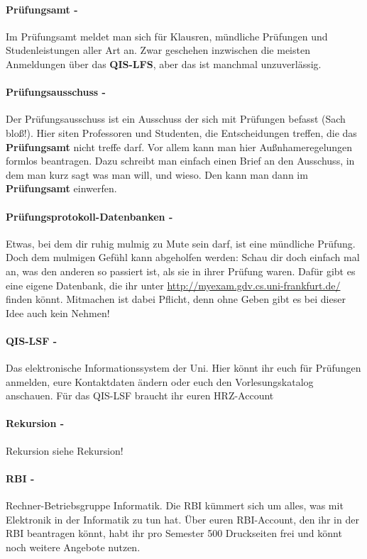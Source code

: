 \paragraph{Prüfungsamt -} Im Prüfungsamt meldet man sich für Klausren, mündliche Prüfungen und Studenleistungen aller Art an. Zwar geschehen inzwischen die meisten Anmeldungen über das \textbf{QIS-LFS}, aber das ist manchmal unzuverlässig.
\paragraph{Prüfungsausschuss -} Der Prüfungsausschuss ist ein Ausschuss der sich mit Prüfungen befasst (Sach bloß!). Hier siten Professoren und Studenten, die Entscheidungen treffen, die das \textbf{Prüfungsamt} nicht treffe darf.  Vor allem kann man hier Außnhameregelungen formlos beantragen. Dazu schreibt man einfach einen Brief an den Ausschuss, in dem man kurz sagt was man will, und wieso. Den kann man dann im \textbf{Prüfungsamt} einwerfen.
\paragraph{Prüfungsprotokoll-Datenbanken -} Etwas, bei dem dir ruhig mulmig zu Mute sein darf, ist eine mündliche Prüfung. Doch dem mulmigen Gefühl kann abgeholfen werden: Schau dir doch einfach mal an, was den anderen so passiert ist, als sie in ihrer Prüfung waren. Dafür gibt es eine eigene Datenbank, die ihr unter \url{http://myexam.gdv.cs.uni-frankfurt.de/} finden könnt. Mitmachen ist dabei Pflicht, denn ohne Geben gibt es bei dieser Idee auch kein Nehmen!
\paragraph{QIS-LSF -} Das elektronische Informationssystem der Uni. Hier könnt ihr euch für Prüfungen anmelden, eure Kontaktdaten ändern oder euch den Vorlesungskatalog anschauen. Für das QIS-LSF braucht ihr euren HRZ-Account
\paragraph{Rekursion -} Rekursion siehe Rekursion!
\paragraph{RBI -} \glqq Rechner-Betriebsgruppe Informatik\grqq . Die RBI kümmert sich um alles, was mit Elektronik in der Informatik zu tun hat. Über euren RBI-Account, den ihr in der RBI beantragen könnt, habt ihr pro Semester 500 Druckseiten frei und könnt noch weitere Angebote nutzen.
